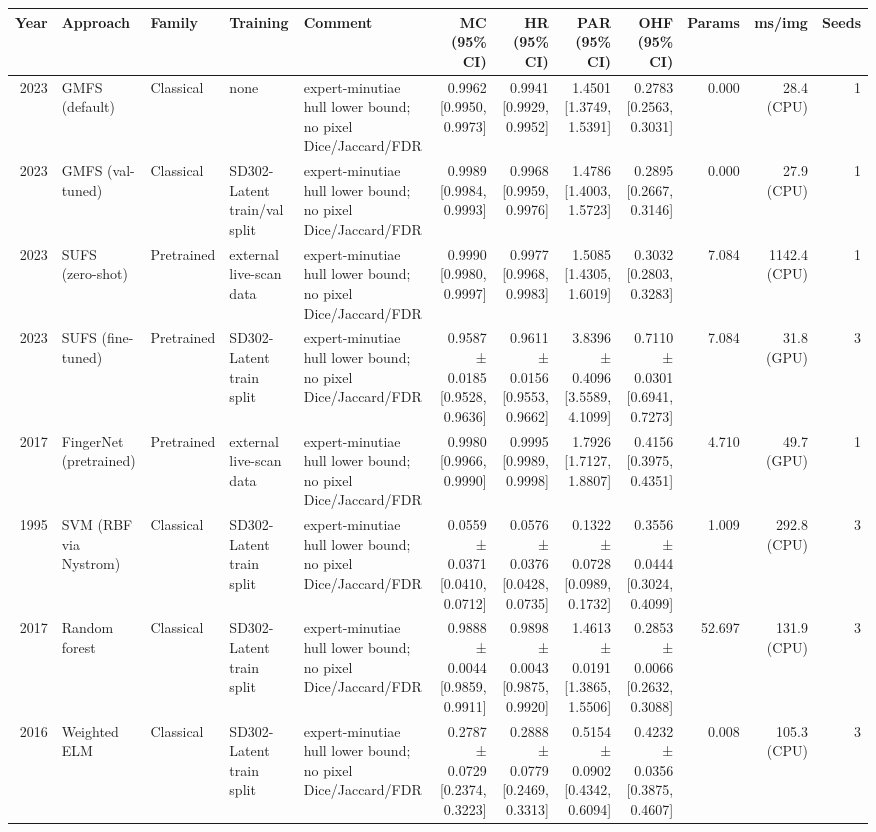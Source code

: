 \begin{table}[t]
\centering
\small
\begin{tabular}{rllllrrrrrrr}
\toprule
Year & Approach & Family & Training & Comment & MC (95\% CI) & HR (95\% CI) & PAR (95\% CI) & OHF (95\% CI) & Params & ms/img & Seeds \\
\midrule
2023 & GMFS (default) & Classical & none & expert-minutiae hull lower bound; no pixel Dice/Jaccard/FDR & 0.9962 [0.9950, 0.9973] & 0.9941 [0.9929, 0.9952] & 1.4501 [1.3749, 1.5391] & 0.2783 [0.2563, 0.3031] & 0.000 & 28.4 (CPU) & 1 \\
2023 & GMFS (val-tuned) & Classical & SD302-Latent train/val split & expert-minutiae hull lower bound; no pixel Dice/Jaccard/FDR & 0.9989 [0.9984, 0.9993] & 0.9968 [0.9959, 0.9976] & 1.4786 [1.4003, 1.5723] & 0.2895 [0.2667, 0.3146] & 0.000 & 27.9 (CPU) & 1 \\
2023 & SUFS (zero-shot) & Pretrained & external live-scan data & expert-minutiae hull lower bound; no pixel Dice/Jaccard/FDR & 0.9990 [0.9980, 0.9997] & 0.9977 [0.9968, 0.9983] & 1.5085 [1.4305, 1.6019] & 0.3032 [0.2803, 0.3283] & 7.084 & 1142.4 (CPU) & 1 \\
2023 & SUFS (fine-tuned) & Pretrained & SD302-Latent train split & expert-minutiae hull lower bound; no pixel Dice/Jaccard/FDR & 0.9587 ± 0.0185 [0.9528, 0.9636] & 0.9611 ± 0.0156 [0.9553, 0.9662] & 3.8396 ± 0.4096 [3.5589, 4.1099] & 0.7110 ± 0.0301 [0.6941, 0.7273] & 7.084 & 31.8 (GPU) & 3 \\
2017 & FingerNet (pretrained) & Pretrained & external live-scan data & expert-minutiae hull lower bound; no pixel Dice/Jaccard/FDR & 0.9980 [0.9966, 0.9990] & 0.9995 [0.9989, 0.9998] & 1.7926 [1.7127, 1.8807] & 0.4156 [0.3975, 0.4351] & 4.710 & 49.7 (GPU) & 1 \\
1995 & SVM (RBF via Nystrom) & Classical & SD302-Latent train split & expert-minutiae hull lower bound; no pixel Dice/Jaccard/FDR & 0.0559 ± 0.0371 [0.0410, 0.0712] & 0.0576 ± 0.0376 [0.0428, 0.0735] & 0.1322 ± 0.0728 [0.0989, 0.1732] & 0.3556 ± 0.0444 [0.3024, 0.4099] & 1.009 & 292.8 (CPU) & 3 \\
2017 & Random forest & Classical & SD302-Latent train split & expert-minutiae hull lower bound; no pixel Dice/Jaccard/FDR & 0.9888 ± 0.0044 [0.9859, 0.9911] & 0.9898 ± 0.0043 [0.9875, 0.9920] & 1.4613 ± 0.0191 [1.3865, 1.5506] & 0.2853 ± 0.0066 [0.2632, 0.3088] & 52.697 & 131.9 (CPU) & 3 \\
2016 & Weighted ELM & Classical & SD302-Latent train split & expert-minutiae hull lower bound; no pixel Dice/Jaccard/FDR & 0.2787 ± 0.0729 [0.2374, 0.3223] & 0.2888 ± 0.0779 [0.2469, 0.3313] & 0.5154 ± 0.0902 [0.4342, 0.6094] & 0.4232 ± 0.0356 [0.3875, 0.4607] & 0.008 & 105.3 (CPU) & 3 \\

\end{tabular}
\end{table}
